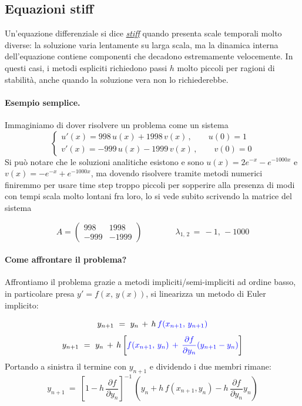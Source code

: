 %
%
\vspace{0.5cm}
\subsection{Equazioni stiff}

Un'equazione differenziale si dice \href{https://en.wikipedia.org/wiki/Stiff_equation}{\emph{stiff}} quando presenta scale temporali
molto diverse: la soluzione varia lentamente su larga scala, ma la dinamica
interna dell'equazione contiene componenti che decadono estremamente velocemente.
In questi casi, i metodi espliciti richiedono passi $h$ molto piccoli per
ragioni di stabilità, anche quando la soluzione vera non lo richiederebbe.

\paragraph{Esempio semplice.}
Immaginiamo di dover risolvere un problema come un sistema 
\[
\begin{cases}
	u'(x) = 998\, u(x) + 1998\, v(x)\,, \quad \quad u(0)=1\\
	v'(x) = -999\, u(x) - 1999\, v(x)\,, \quad \quad v(0)=0
\end{cases}
\]
Si può notare che le soluzioni analitiche esistono e sono $u(x)=2e^{-x}-e^{-1000x}$ e $v(x)=-e^{-x}+e^{-1000x}$, ma dovendo risolvere tramite metodi numerici finiremmo per usare time step troppo piccoli per sopperire alla presenza di modi con tempi scala molto lontani fra loro, lo si vede subito scrivendo la matrice del sistema 

\[
A = \begin{pmatrix}
	998 & 1998 \\
	-999 & -1999
\end{pmatrix}
\quad \quad \quad \quad \lambda_{1,\, 2}\, =\, -1,\, -1000
\]

\paragraph{Come affrontare il problema?}

Affrontiamo il problema grazie a metodi impliciti/semi-impliciti ad ordine basso, in particolare presa $y'=f(x,\, y(x))$, si linearizza un metodo di Euler implicito:

\[ y_{n+1}\ =\ y_n\, +\, h\, \color{blue}{f(x_{n+1},\, y_{n+1})}\]
\[ y_{n+1}\ =\ y_n\, +\, h\left[ \color{blue}{ f(x_{n+1},\, y_n) \, +\, \frac{\partial
		f}{\partial y_n} (y_{n+1} - y_n)} \color{black}\right] \]
Portando a sinistra il termine con $y_{n+1}$ e dividendo i due membri rimane:
\[ y_{n+1}\ =\ \left[  1-h\, \frac{\partial
	f}{\partial y_n}  \right]^{-1}\, \left( y_n + h\, f(x_{n+1}, y_{n} ) - h\, \frac{\partial f}{\partial y_n} y_n \right)\]



